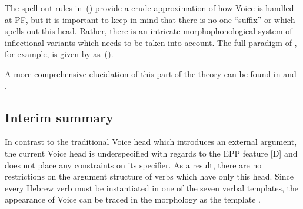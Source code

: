 The spell-out rules in~(\lastx) provide a crude approximation of how Voice is handled at PF, but it is important to keep in mind that there is no one ``suffix'' {\tkal} or {\tpie} which spells out this head. Rather, there is an intricate morphophonological system of inflectional variants which needs to be taken into account. The full paradigm of {\tpie}, for example, is given by \cite{kastner15nels} as~(\nextx).

\ex
{}
\xe

A more comprehensive elucidation of this part of the theory can be found in \cite{faust12} and \cite{kastner18nllt}.

	\subsection{Interim summary}
In contrast to the traditional Voice head which introduces an external argument, the current Voice head is underspecified with regards to the EPP feature [D] and does not place any constraints on its specifier. As a result, there are no restrictions on the argument structure of verbs which have only this head. Since every Hebrew verb must be instantiated in one of the seven verbal templates, the appearance of Voice can be traced in the morphology as the template {\tkal}.

